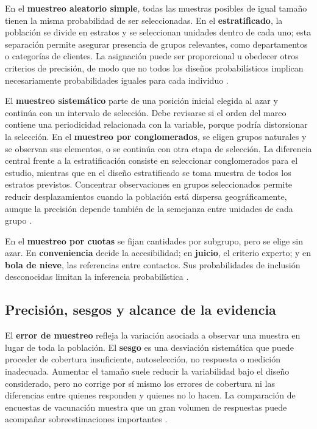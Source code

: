 {En el \textbf{muestreo aleatorio simple}, todas las muestras posibles de igual tamaño tienen la misma probabilidad de ser seleccionadas. En el \textbf{estratificado}, la población se divide en estratos y se seleccionan unidades dentro de cada uno; esta separación permite asegurar presencia de grupos relevantes, como departamentos o categorías de clientes. La asignación puede ser proporcional u obedecer otros criterios de precisión, de modo que no todos los diseños probabilísticos implican necesariamente probabilidades iguales para cada individuo \citep{holmesBusiness2023}.

El \textbf{muestreo sistemático} parte de una posición inicial elegida al azar y continúa con un intervalo de selección. Debe revisarse si el orden del marco contiene una periodicidad relacionada con la variable, porque podría distorsionar la selección. En el \textbf{muestreo por conglomerados}, se eligen grupos naturales y se observan sus elementos, o se continúa con otra etapa de selección. La diferencia central frente a la estratificación consiste en seleccionar conglomerados para el estudio, mientras que en el diseño estratificado se toma muestra de todos los estratos previstos. Concentrar observaciones en grupos seleccionados permite reducir desplazamientos cuando la población está dispersa geográficamente, aunque la precisión depende también de la semejanza entre unidades de cada grupo \citep{holmesBusiness2023,statcanProb2021}.

En el \textbf{muestreo por cuotas} se fijan cantidades por subgrupo, pero se elige sin azar. En \textbf{conveniencia} decide la accesibilidad; en \textbf{juicio}, el criterio experto; y en \textbf{bola de nieve}, las referencias entre contactos. Sus probabilidades de inclusión desconocidas limitan la inferencia probabilística \citep{statcanNoProb2021}.

\subsection{Precisión, sesgos y alcance de la evidencia}
El \textbf{error de muestreo} refleja la variación asociada a observar una muestra en lugar de toda la población. El \textbf{sesgo} es una desviación sistemática que puede proceder de cobertura insuficiente, autoselección, no respuesta o medición inadecuada. Aumentar el tamaño suele reducir la variabilidad bajo el diseño considerado, pero no corrige por sí mismo los errores de cobertura ni las diferencias entre quienes responden y quienes no lo hacen. La comparación de encuestas de vacunación muestra que un gran volumen de respuestas puede acompañar sobreestimaciones importantes \citep{holmesBusiness2023,bradley2021}.

}
